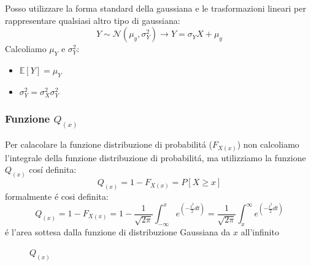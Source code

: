                 Posso utilizzare la forma standard della gaussiana e le trasformazioni lineari per rappresentare qualsiasi altro tipo di gaussiana:
                \[
                    Y\sim \mathcal{N}(\mu_y,\sigma_Y^2) \rightarrow Y = \sigma_Y X + \mu_y
                \]
                Calcoliamo $\mu_Y$ e $\sigma_Y^2$:
                \begin{itemize}
                    \item {$\mathbb{E}[Y] = \mu_Y$}
                    \item {$\sigma_Y^2 = \sigma_X^2 \sigma_Y^2 $}
                \end{itemize}
        \subsubsection{Funzione $Q_{(x)}$}
            Per calacolare la funzione distribuzione di probabilitá ($F_{X(x)}$) non calcoliamo l'integrale della funzione distribuzione di probabilitá, 
            ma utilizziamo la funzione $Q_{(x)}$ cosí definita:
            \[
                Q_{(x)} = 1-F_{X(x)} = P[X\geq x]  
            \]
            formalmente é cosi definita:
            \[
                Q_{(x)} = 1-F_{X(x)} = 1 - \frac{1}{\sqrt{2\pi}} \int_{-\infty}^{x}e^{\left(-\frac{t^2}{2}dt\right)} = \frac{1}{\sqrt{2\pi}} \int_{x}^{\infty}e^{\left(-\frac{t^2}{2}dt\right)}  
            \]
            é l'area sottesa dalla funzione di distribuzione Gaussiana da $x$ all'infinito

            \begin{figure}[H]
                \centering
                \caption{\color{red}$Q_{(x)}$}
            \end{figure}
